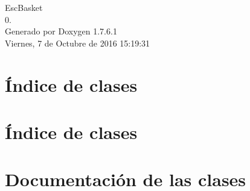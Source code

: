 \documentclass[a4paper]{book}
\begin{document}
\hypersetup{pageanchor=false,citecolor=blue}
\begin{titlepage}
\vspace*{7cm}
\begin{center}
{\Large \-Esc\-Basket \\[1ex]\large 0. }\\
\vspace*{1cm}
{\large \-Generado por Doxygen 1.7.6.1}\\
\vspace*{0.5cm}
{\small Viernes, 7 de Octubre de 2016 15:19:31}\\
\end{center}
\end{titlepage}
\clearemptydoublepage
{}
\tableofcontents
\clearemptydoublepage
{}
\hypersetup{pageanchor=true,citecolor=blue}
\chapter{Índice de clases}

\chapter{Índice de clases}

\chapter{\-Documentación de las clases}





















\printindex
\end{document}

